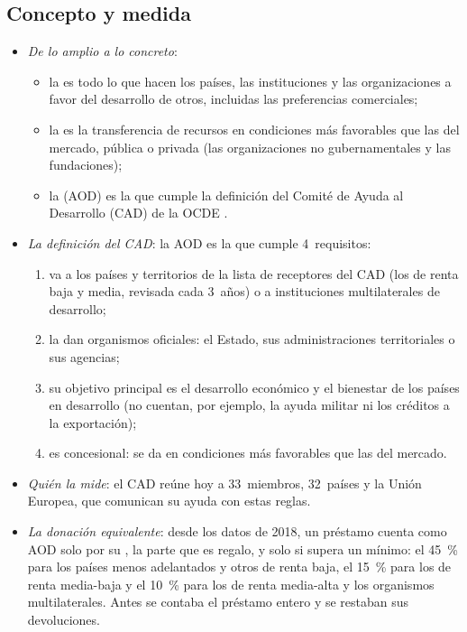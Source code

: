 \documentclass[11pt]{article}
\begin{document}
\subsection{Concepto y medida}\label{sec:aod-concepto}

\begin{itemize}
\item \emph{De lo amplio a lo concreto}:
  \begin{itemize}
  \item la  es todo lo que hacen los países, las instituciones y las organizaciones a favor del desarrollo de otros, incluidas las preferencias comerciales;
  \item la  es la transferencia de recursos en condiciones más favorables que las del mercado, pública o privada (las organizaciones no gubernamentales y las fundaciones);
  \item la  (AOD) es la que cumple la definición del Comité de Ayuda al Desarrollo (CAD) de la OCDE .
  \end{itemize}
\item \emph{La definición del CAD}: la AOD es la que cumple 4~requisitos\nocite{OCDE2026DefinicionAOD}:
  \begin{enumerate}
  \item va a los países y territorios de la lista de receptores del CAD (los de renta baja y media, revisada cada 3~años) o a instituciones multilaterales de desarrollo;
  \item la dan organismos oficiales: el Estado, sus administraciones territoriales o sus agencias;
  \item su objetivo principal es el desarrollo económico y el bienestar de los países en desarrollo (no cuentan, por ejemplo, la ayuda militar ni los créditos a la exportación);
  \item es concesional: se da en condiciones más favorables que las del mercado.
  \end{enumerate}
\item \emph{Quién la mide}: el CAD reúne hoy a 33~miembros, 32~países y la Unión Europea, que comunican su ayuda con estas reglas\nocite{OCDE2026MiembrosCAD}.
\item \emph{La donación equivalente}: desde los datos de 2018, un préstamo cuenta como AOD solo por su , la parte que es regalo, y solo si supera un mínimo: el 45~\% para los países menos adelantados y otros de renta baja, el 15~\% para los de renta media-baja y el 10~\% para los de renta media-alta y los organismos multilaterales\nocite{OCDE2026DefinicionAOD}. Antes se contaba el préstamo entero y se restaban sus devoluciones.

\end{itemize}
\end{document}
